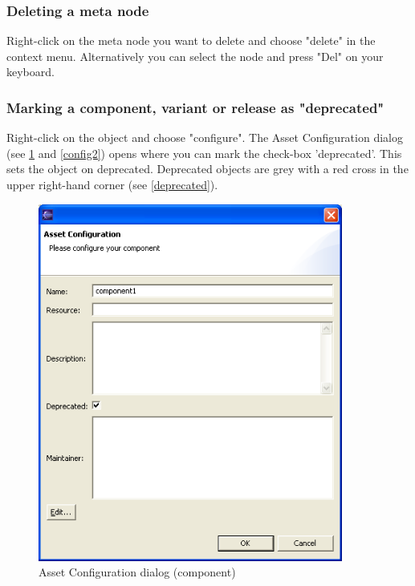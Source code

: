\subsubsection{Deleting a meta node}

Right-click on the meta node you want to delete and choose "delete" in the context
menu. Alternatively you
can select the node and press "Del" on your keyboard.

\subsubsection{Marking a component, variant or release as "deprecated"}
Right-click on the object and choose "configure". The Asset Configuration dialog (see \ref{config} and \ref{config2}) opens where you can
mark the check-box 'deprecated'. This sets the object on deprecated. Deprecated objects are grey with a 
red cross in the upper right-hand corner (see \ref{deprecated}).

\begin{figure}[h!]
\begin{center}
\includegraphics[width=10cm]{config.png}
   \caption{Asset Configuration dialog (component)}
\label{config}
\end{center}
\end{figure}\par

